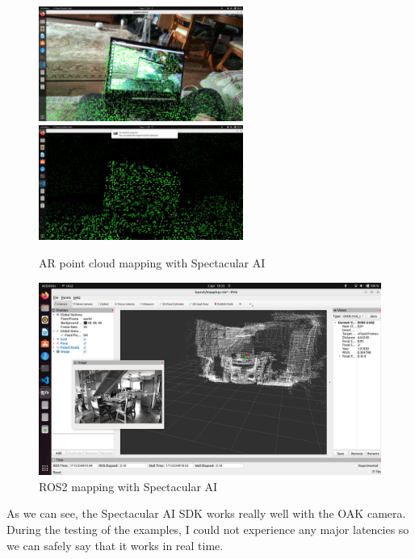 \begin{figure}[htbp]
	\centering
	\includegraphics[width=67mm, keepaspectratio]{figures/spectacular_ai_mapping_ar_pc1.png}\hspace{1cm}
	\includegraphics[width=67mm, keepaspectratio]{figures/spectacular_ai_mapping_ar_pc2.png}\\\vspace{5mm}
	\caption{AR point cloud mapping with Spectacular AI}
    \label{fig:SPAI_point_cloud_mapping}
\end{figure}

\begin{figure}[htbp]
	\centering
	\includegraphics[width=150mm, keepaspectratio]{figures/spectacular_ai_mapping_ros2.png}
	\caption{ROS2 mapping with Spectacular AI}
	\label{fig:SPAI_ros_mapping}
\end{figure}

As we can see, the Spectacular AI SDK works really well with the OAK camera. During the testing of the examples, I could not experience any major latencies so we can safely say that it works in real time.

